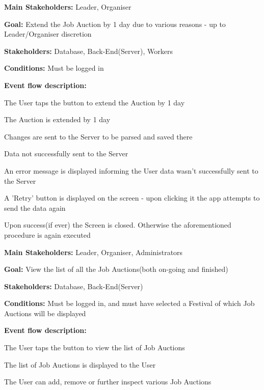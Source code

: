 			\noindent {}
			\begin{packed_item}
				\item \textbf{Main Stakeholders:} Leader, Organiser
				\item \textbf{Goal:} Extend the Job Auction by 1 day due to various reasons - up to Leader/Organiser discretion
				\item \textbf{Stakeholders: } Database, Back-End(Server), Workers
				\item \textbf{Conditions: } Must be logged in
				\item \textbf{Event flow description: }
				\begin{packed_enum}
					\item The User taps the button to extend the Auction by 1 day
					\item The Auction is extended by 1 day
					\item Changes are sent to the Server to be parsed and saved there
				\end{packed_enum}
				
				\begin{packed_item}
					\item[3.a] Data not successfully sent to the Server
					\item[] \begin{packed_enum}
						\item An error message is displayed informing the User data wasn't successfully sent to the Server
						\item A 'Retry' button is displayed on the screen - upon clicking it the app attempts to send the data again
						\item Upon success(if ever) the Screen is closed. Otherwise the aforementioned procedure is again executed
					\end{packed_enum}
				\end{packed_item}
			\end{packed_item}
		
			\noindent \underbar{\textbf{UC41 - View list of Job Auctions}}
			\begin{packed_item}
				\item \textbf{Main Stakeholders:} Leader, Organiser, Administrators
				\item \textbf{Goal:} View the list of all the Job Auctions(both on-going and finished)
				\item \textbf{Stakeholders: } Database, Back-End(Server)
				\item \textbf{Conditions: } Must be logged in, and must have selected a Festival of which Job Auctions will be displayed
				\item \textbf{Event flow description: }
				\begin{packed_enum}
					\item The User taps the button to view the list of Job Auctions
					\item The list of Job Auctions is displayed to the User
					\item The User can add, remove or further inspect various Job Auctions
				\end{packed_enum}
			\end{packed_item}
			
